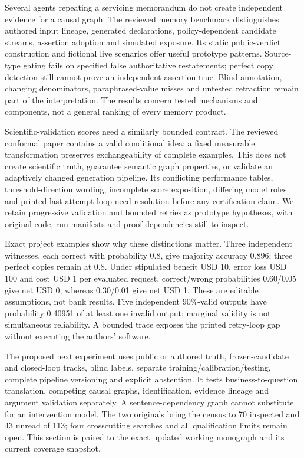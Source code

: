 Several agents repeating a servicing memorandum do not create
independent evidence for a causal graph. The reviewed memory benchmark
distinguishes authored input lineage, generated declarations,
policy-dependent candidate streams, assertion adoption and simulated
exposure. Its static public-verdict construction and fictional live
scenarios offer useful prototype patterns. Source-type gating fails on
specified false authoritative restatements; perfect copy detection still
cannot prove an independent assertion true. Blind annotation, changing
denominators, paraphrased-value misses and untested retraction remain
part of the interpretation. The results concern tested mechanisms and
components, not a general ranking of every memory product.
\citep{exec23_epistemic_admission}

Scientific-validation scores need a similarly bounded contract. The
reviewed conformal paper contains a valid conditional idea: a fixed
measurable transformation preserves exchangeability of complete
examples. This does not create scientific truth, guarantee semantic
graph properties, or validate an adaptively changed generation pipeline.
Its conflicting performance tables, threshold-direction wording,
incomplete score exposition, differing model roles and printed
last-attempt loop need resolution before any certification claim. We
retain progressive validation and bounded retries as prototype
hypotheses, with original code, run manifests and proof dependencies
still to inspect. \citep{exec23_scientific_conformal}

Exact project examples show why these distinctions matter. Three
independent witnesses, each correct with probability 0.8, give majority
accuracy 0.896; three perfect copies remain at 0.8. Under stipulated
benefit USD 10, error loss USD 100 and cost USD 1 per evaluated request,
correct/wrong probabilities 0.60/0.05 give net USD 0, whereas 0.30/0.01
give net USD 1. These are editable assumptions, not bank results. Five
independent 90\%-valid outputs have probability 0.40951 of at least one
invalid output; marginal validity is not simultaneous reliability. A
bounded trace exposes the printed retry-loop gap without executing the
authors' software. \citep{exec23_admission_conformal_reference}

The proposed next experiment uses public or authored truth,
frozen-candidate and closed-loop tracks, blind labels, separate
training/calibration/testing, complete pipeline versioning and explicit
abstention. It tests business-to-question translation, competing causal
graphs, identification, evidence lineage and argument validation
separately. A sentence-dependency graph cannot substitute for an
intervention model. The two originals bring the census to 70 inspected
and 43 unread of 113; four crosscutting searches and all qualification
limits remain open. This section is paired to the exact updated working
monograph and its current coverage snapshot.
\citep{sp23admission_reader,sp23admission_progress}

